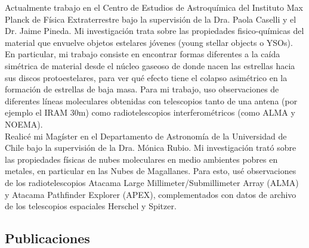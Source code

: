 \documentclass[11pt,a4paper,verdana]{moderncv} %
\begin{document}
Actualmente trabajo en el Centro de Estudios de Astroqu\'imica del Instituto Max Planck de F\'isica Extraterrestre bajo la supervisi\'on de la Dra. Paola Caselli y el Dr. Jaime Pineda. Mi investigaci\'on trata sobre las propiedades fisico-qu\'imicas del material que envuelve objetos estelares j\'ovenes (young stellar objects o YSOs). En particular, mi trabajo consiste en encontrar formas diferentes a la ca\'ida sim\'etrica de material desde el n\'ucleo gaseoso de donde nacen las estrellas hacia sus discos protoestelares, para ver qu\'e efecto tiene el colapso asim\'etrico en la formaci\'on de estrellas de baja masa. Para mi trabajo, uso observaciones de diferentes l\'ineas moleculares obtenidas con telescopios tanto de una antena (por ejemplo el IRAM 30m) como radiotelescopios interferom\'etricos (como ALMA y NOEMA).
\\
Realic\'e mi Mag\'ister en el Departamento de Astronom\'ia de la Universidad de Chile bajo la supervisi\'on de la Dra. M\'onica Rubio. Mi investigaci\'on trat\'o sobre las propiedades f\'isicas de nubes moleculares en medio ambientes pobres en metales, en particular en las Nubes de Magallanes. Para esto, us\'e observaciones de los radiotelescopios Atacama Large Millimeter/Submillimeter Array (ALMA) y Atacama Pathfinder Explorer (APEX), complementados con datos de archivo de los telescopios espaciales Herschel y Spitzer.
\newpage

\subsection{Publicaciones}
\end{document}
